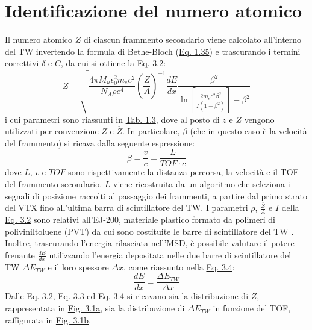 \documentclass[12pt,a4paper,twoside]{report}
\begin{document}
	\section{Identificazione del numero atomico}\label{sec:atomic_number_identification}
	Il numero atomico $Z$ di ciascun frammento secondario viene calcolato all'interno del TW invertendo la formula di Bethe-Bloch (\hyperref[eq:bethe_bloch]{Eq. 1.35}) e trascurando i termini correttivi $\delta$ e $C$, da cui si ottiene la \hyperref[eq:atomic_number]{Eq. 3.2}:
	\begin{equation}
		Z=\sqrt{\frac{4\pi M_u\epsilon_0^2m_ec^2}{N_A\rho e^4}\left(\frac{\overline{Z}}{A}\right)^{-1}\frac{dE}{dx}\frac{\beta^2}{\ln{\left[\frac{2m_ec^2\beta^2}{I\left(1-\beta^2\right)}\right]}-\beta^2}}
		\label{eq:atomic_number}
	\end{equation}
	i cui parametri sono riassunti in \hyperref[tab:bethe_bloch]{Tab. 1.3}, dove al posto di $z$ e $Z$ vengono utilizzati per convenzione $Z$ e $\overline{Z}$. In particolare, $\beta$ (che in questo caso è la velocità del frammento) si ricava dalla seguente espressione:
	\begin{equation}
		\beta=\frac{v}{c}=\frac{L}{TOF\cdot c}
		\label{eq:beta_beam}
	\end{equation}
	dove $L$, $v$ e $TOF$ sono rispettivamente la distanza percorsa, la velocità e il TOF del frammento secondario. $L$ viene ricostruita da un algoritmo che seleziona i segnali di posizione raccolti al passaggio dei frammenti, a partire dal primo strato del VTX fino all'ultima barra di scintillatore del TW. I parametri $\rho$, $\frac{\overline{Z}}{A}$ e $I$ della \hyperref[eq:atomic_number]{Eq. 3.2} sono relativi all'EJ-$200$, materiale plastico formato da polimeri di poliviniltoluene (PVT) da cui sono costituite le barre di scintillatore del TW \cite{pvt}. Inoltre, trascurando l'energia rilasciata nell'MSD, è possibile valutare il potere frenante $\frac{dE}{dx}$ utilizzando l'energia depositata nelle due barre di scintillatore del TW $\Delta E_{TW}$ e il loro spessore $\Delta x$, come riassunto nella \hyperref[eq:stopping_power]{Eq. 3.4}:
	\begin{equation}
		\frac{dE}{dx}=\frac{\Delta E_{TW}}{\Delta x}
		\label{eq:stopping_power}
	\end{equation}
	Dalle \hyperref[eq:atomic_number]{Eq. 3.2}, \hyperref[eq:beta_beam]{Eq. 3.3} ed \hyperref[eq:stopping_power]{Eq. 3.4} si ricavano sia la distribuzione di $Z$, rappresentata in \hyperref[fig:atomic_numbersa]{Fig. 3.1a}, sia la distribuzione di $\Delta E_{TW}$ in funzione del TOF, raffigurata in \hyperref[fig:atomic_numbersb]{Fig. 3.1b}.
	
\end{document}
